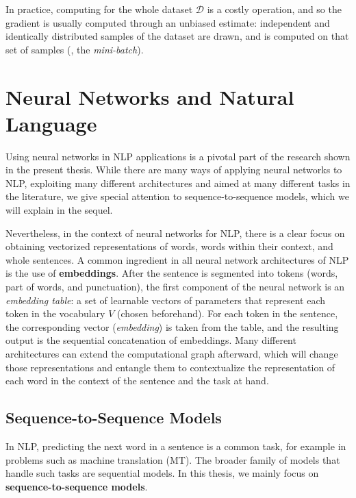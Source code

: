In practice, computing  for the whole dataset
$\mathcal D$ is a costly operation, and so the gradient is usually
computed through an unbiased estimate: independent and identically
distributed samples of the dataset are drawn, and 
is computed on that set of samples (\ie, the \textit{mini-batch}).


\section{Neural Networks and Natural Language}

\noindent Using neural networks in NLP applications is a pivotal part
of the research shown in the present thesis. While there are many
ways of applying neural networks to NLP, exploiting many different
architectures and aimed at many different tasks in the literature, we give
special attention to sequence-to-sequence models, which we will
explain in the sequel.

Nevertheless, in the context of neural networks for NLP, there is a
clear focus on obtaining vectorized representations of words, words
within their context, and whole sentences. A common ingredient in all
neural network architectures of NLP is the use of
\textbf{embeddings}. After the sentence is segmented into tokens
(words, part of words, and punctuation), the first component of the
neural network is an \textit{embedding table}: a set of learnable
vectors of parameters that represent each token in the vocabulary $V$
(chosen beforehand). For each token in the sentence, the
corresponding vector (\textit{embedding}) is taken from the table,
and the resulting output is the sequential concatenation of
embeddings. Many different architectures can extend the computational
graph afterward, which will change those representations and entangle
them to contextualize the representation of each word in the context
of the sentence and the task at hand.

\subsection{Sequence-to-Sequence Models}

\noindent In NLP, predicting the next word in a sentence is a common
task, for example in problems such as machine translation (MT). The
broader family of models that handle such tasks are sequential
models. In this thesis, we mainly focus on
\textbf{sequence-to-sequence models}.

